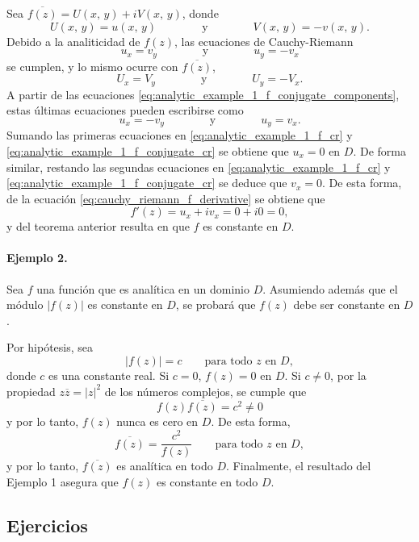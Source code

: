 \documentclass[a4paper]{report}
\begin{document}
Sea \(\overline{f(z)}=U(x,\,y)+iV(x,\,y)\), donde
\begin{equation}\label{eq:analytic_example_1_f_conjugate_components}
 U(x,\,y)=u(x,\,y)
 \qquad\qquad\textrm{y}\qquad\qquad
 V(x,\,y)=-v(x,\,y). 
\end{equation}
Debido a la analiticidad de \(f(z)\), las ecuaciones de Cauchy-Riemann 
\begin{equation}\label{eq:analytic_example_1_f_cr}
 u_x=v_y
 \qquad\qquad\textrm{y}\qquad\qquad
 u_y=-v_x
\end{equation}
se cumplen, y lo mismo ocurre con \(\overline{f(z)}\),
\[
 U_x=V_y
 \qquad\qquad\textrm{y}\qquad\qquad
 U_y=-V_x.
\]
A partir de las ecuaciones \ref{eq:analytic_example_1_f_conjugate_components}, estas últimas ecuaciones pueden escribirse como
\begin{equation}\label{eq:analytic_example_1_f_conjugate_cr}
 u_x=-v_y
 \qquad\qquad\textrm{y}\qquad\qquad
 u_y=v_x .
\end{equation}
Sumando las primeras ecuaciones en \ref{eq:analytic_example_1_f_cr} y \ref{eq:analytic_example_1_f_conjugate_cr} se obtiene que \(u_x=0\) en \(D\). De forma similar, restando las segundas ecuaciones en \ref{eq:analytic_example_1_f_cr} y \ref{eq:analytic_example_1_f_conjugate_cr} se deduce que \(v_x=0\). De esta forma, de la ecuación \ref{eq:cauchy_riemann_f_derivative} se obtiene que 
\[
 f'(z)=u_x+iv_x=0+i0=0,
\]
y del teorema anterior resulta en que \(f\) es constante en \(D\).

\paragraph{Ejemplo 2.} Sea \(f\) una función que es analítica en un dominio \(D\). Asumiendo además que el módulo \(|f(z)|\) es constante en \(D\), se probará que \(f(z)\) debe ser constante en \(D\).

Por hipótesis, sea
\[
 |f(z)|=c\qquad\textrm{para todo }z\textrm{ en }D,
\]
donde \(c\) es una constante real. Si \(c=0\), \(f(z)=0\) en \(D\). Si \(c\neq0\), por la propiedad \(z\overline{z}=|z|^2\) de los números complejos, se cumple que 
\[
 f(z)\overline{f(z)}=c^2\neq0
\]
y por lo tanto, \(f(z)\) nunca es cero en \(D\). De esta forma,
\[
 \overline{f(z)}=\frac{c^2}{f(z)}\qquad\textrm{para todo }z\textrm{ en }D,
\]
y por lo tanto, \(\overline{f(z)}\) es analítica en todo \(D\). Finalmente, el resultado del Ejemplo 1 asegura que \(f(z)\) es constante en todo \(D\).

\subsection*{Ejercicios}
\end{document}
